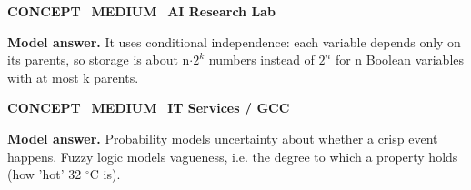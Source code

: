 \documentclass[11pt]{article}
\begin{document}
\begin{tcolorbox}[enhanced,breakable,colback=white,colframe=teal,arc=2mm,boxrule=0.8pt,left=3mm,right=3mm,
 title={\textbf{QIV.04}\quad Why is a Bayesian network more compact than a full joint table?},fonttitle=\color{white}\small,colbacktitle=teal]
\colorbox{teal!15}{\scriptsize\bfseries\color{teal} CONCEPT}\
\colorbox{gold!85!black!15}{\scriptsize\bfseries\color{gold!85!black} MEDIUM}\
\colorbox{navy!8}{\scriptsize\bfseries\color{navy} AI Research Lab}\par\smallskip
\textbf{\color{navy}Model answer.} It uses conditional independence: each variable depends only on its parents, so storage is about n$\cdot$$2^{k}$ numbers instead of $2^{n}$ for n Boolean variables with at most k parents.
\end{tcolorbox}
\begin{tcolorbox}[enhanced,breakable,colback=white,colframe=teal,arc=2mm,boxrule=0.8pt,left=3mm,right=3mm,
 title={\textbf{QIV.05}\quad Probability vs fuzzy logic --- what does each model?},fonttitle=\color{white}\small,colbacktitle=teal]
\colorbox{teal!15}{\scriptsize\bfseries\color{teal} CONCEPT}\
\colorbox{gold!85!black!15}{\scriptsize\bfseries\color{gold!85!black} MEDIUM}\
\colorbox{navy!8}{\scriptsize\bfseries\color{navy} IT Services / GCC}\par\smallskip
\textbf{\color{navy}Model answer.} Probability models uncertainty about whether a crisp event happens. Fuzzy logic models vagueness, i.e. the degree to which a property holds (how 'hot' 32 $^\circ$C is).
\end{tcolorbox}
\end{document}
